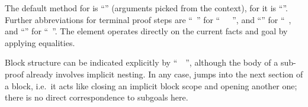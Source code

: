 \begin{isabellebody}
\begin{isamarkuptext}
  The default method for \hyperlink{command.proof}{\mbox{}} is ``\hyperlink{method.rule}{\mbox{}}''
  (arguments picked from the context), for \hyperlink{command.qed}{\mbox{}} it is
  ``\hyperlink{method.-}{\mbox{}}''.  Further abbreviations for terminal proof steps
  are ``\hyperlink{command.by}{\mbox{}}~'' for
  ``\hyperlink{command.proof}{\mbox{}}~~\hyperlink{command.qed}{\mbox{}}~'', and ``\hyperlink{command.ddot}{\mbox{}}'' for ``\hyperlink{command.by}{\mbox{}}~\hyperlink{method.rule}{\mbox{}}, and ``\hyperlink{command.dot}{\mbox{}}'' for ``\hyperlink{command.by}{\mbox{}}~\hyperlink{method.this}{\mbox{}}''.  The \hyperlink{command.unfolding}{\mbox{}} element operates
  directly on the current facts and goal by applying equalities.

  \medskip Block structure can be indicated explicitly by ``\hyperlink{command.braceleft}{\mbox{}}~~\hyperlink{command.braceright}{\mbox{}}'', although the body of a sub-proof
  already involves implicit nesting.  In any case, \hyperlink{command.next}{\mbox{}}
  jumps into the next section of a block, i.e.\ it acts like closing
  an implicit block scope and opening another one; there is no direct
  correspondence to subgoals here.


\end{isamarkuptext}
\end{isabellebody}
